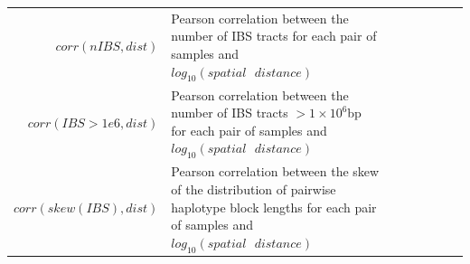\documentclass[11pt,twoside,lineno]{preprint}
\begin{document}
\begin{table}
\begin{tabular}{rllrrrrr}
$corr(nIBS,dist)$ & \makecell[l]{Pearson correlation between the number of IBS tracts \\for each pair of samples and $log_{10}(spatial\text{ }distance)$} \\
$corr(IBS>1e6,dist)$ & \makecell[l]{Pearson correlation between the number of IBS tracts $> 1\times10^6$bp \\for each pair of samples and $log_{10}(spatial\text{ }distance)$} \\
$corr(skew(IBS),dist)$ & \makecell[l]{Pearson correlation between the skew of the distribution of pairwise haplotype\\ block lengths for each pair of samples and $log_{10}(spatial\text{ }distance)$} \\
\end{tabular}
\end{table}
\end{document}
